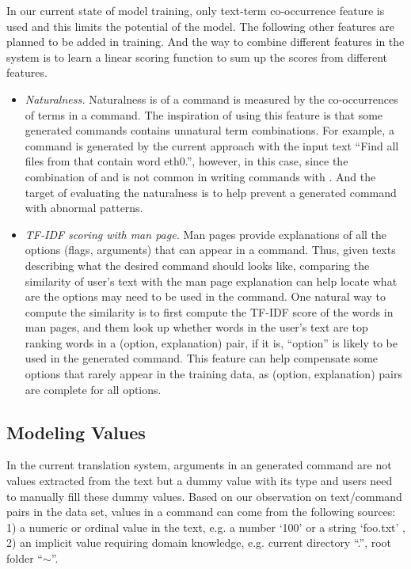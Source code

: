 In our current state of model training, only text-term co-occurrence feature is used and this limits the potential of the model. The following other features are planned to be added in training. And the way to combine different features in the system is to learn a linear scoring function to sum up the scores from different features.
\begin{itemize}\itemsep-1pt
\item \textit{Naturalness.} Naturalness is of a command is measured by the co-occurrences of terms in a command. The inspiration of using this feature is that some generated commands contains unnatural term combinations. For example, a command  is generated by the current approach with the input text ``Find all files from that contain word eth0.'', however, in this case, since the combination of  and  is not common in writing commands with . And the target of evaluating the naturalness is to help prevent a generated command with abnormal patterns.
\item \textit{TF-IDF scoring with man page.} Man pages provide explanations of all the options (flags, arguments) that can appear in a command. Thus, given texts describing what the desired command should looks like, comparing the similarity of user's text with the man page explanation can help locate what are the options may need to be used in the command. One natural way to compute the similarity is to first compute the TF-IDF score of the words in man pages, and them look up whether words in the user's text are top ranking words in a (option, explanation) pair, if it is, ``option'' is likely to be used in the generated command. This feature can help compensate some options that rarely appear in the training data, as (option, explanation) pairs are complete for all options.
\end{itemize}

\subsection{Modeling Values}
\label{future:semantics}

In the current translation system, arguments in an generated command are not values extracted from the text but a dummy value with its type and users need to manually fill these dummy values. Based on our observation on text/command pairs in the data set, values in a command can come from the following sources: 1) a numeric or ordinal value in the text, e.g. a number `100' or a string `foo.txt' , 2) an implicit value requiring domain knowledge, e.g. current directory ``.'', root folder ``$\sim$''.

